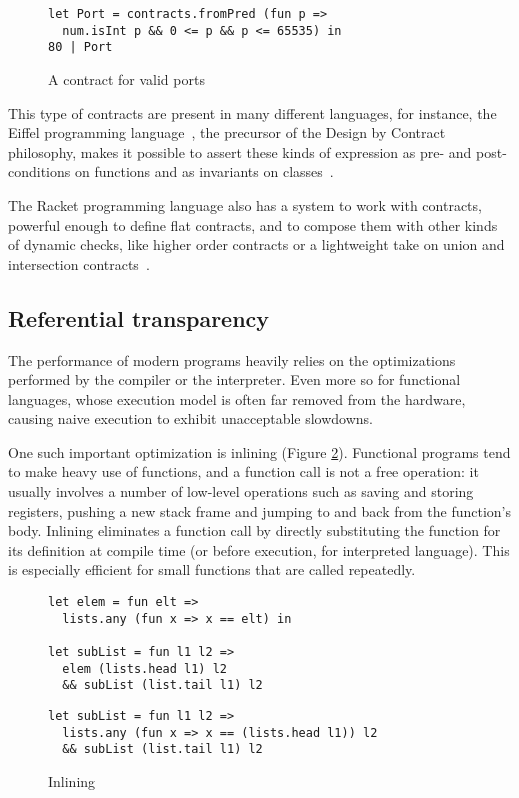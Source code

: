 \documentclass[sigplan,10pt]{acmart}
\begin{document}
\begin{figure}[h]
  \begin{center}
\begin{lstlisting}[language=nickel]
let Port = contracts.fromPred (fun p =>
  num.isInt p && 0 <= p && p <= 65535) in
80 | Port
\end{lstlisting}
\end{center}
\caption{A contract for valid ports}
\label{fig:port-contract}
\end{figure}

This type of contracts are present in many different languages,
for instance, the Eiffel programming language~\cite{meyer1987eiffel}, the precursor
of the Design by Contract philosophy, makes it possible to assert
these kinds of expression as pre- and post-conditions on
functions and as invariants on classes~\cite{EiffelDesignByContract}.

The Racket programming language also has a system to work with
contracts, powerful enough to define flat contracts, and
to compose them with other kinds of dynamic checks,
like higher order contracts or a lightweight take on union
and intersection contracts~\cite{RacketContracts}.


\subsection{Referential transparency}
\label{sec:optimizations}

The performance of modern programs heavily relies on the optimizations performed
by the compiler or the interpreter. Even more so for functional languages, whose
execution model is often far removed from the hardware, causing naive execution
to exhibit unacceptable slowdowns.

One such important optimization is inlining (Figure
\ref{fig:optimizations-inlining-ex}). Functional programs tend to make heavy use
of functions, and a function call is not a free operation: it usually involves a
number of low-level operations such as saving and storing registers, pushing a new stack
frame and jumping to and back from the function's body. Inlining eliminates a
function call by directly substituting the function for its definition at
compile time (or before execution, for interpreted language). This is especially
efficient for small functions that are called repeatedly.

\begin{figure}[h]
  \begin{center}
\begin{lstlisting}[language=nickel,title={Source program}]
let elem = fun elt =>
  lists.any (fun x => x == elt) in

let subList = fun l1 l2 =>
  elem (lists.head l1) l2
  && subList (list.tail l1) l2
\end{lstlisting}
\begin{lstlisting}[language=nickel,title={Optimized program}]
let subList = fun l1 l2 =>
  lists.any (fun x => x == (lists.head l1)) l2
  && subList (list.tail l1) l2
\end{lstlisting}
  \end{center}
\caption{Inlining}
\label{fig:optimizations-inlining-ex}
\end{figure}
\end{document}
